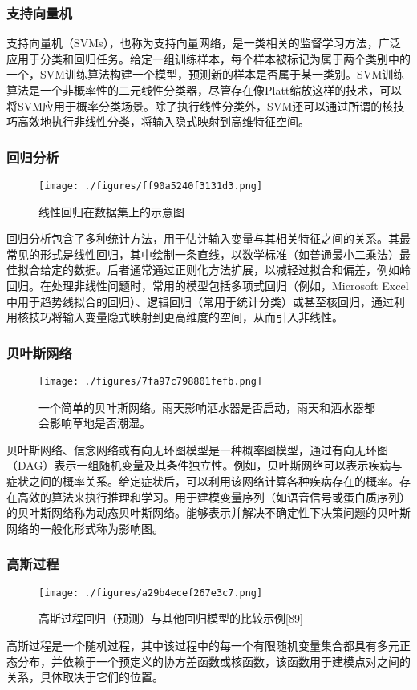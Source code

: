 \subsubsection{支持向量机}   
支持向量机（SVMs），也称为支持向量网络，是一类相关的监督学习方法，广泛应用于分类和回归任务。给定一组训练样本，每个样本被标记为属于两个类别中的一个，SVM训练算法构建一个模型，预测新的样本是否属于某一类别。SVM训练算法是一个非概率性的二元线性分类器，尽管存在像Platt缩放这样的技术，可以将SVM应用于概率分类场景。除了执行线性分类外，SVM还可以通过所谓的核技巧高效地执行非线性分类，将输入隐式映射到高维特征空间。
\subsubsection{回归分析}
\begin{figure}[ht]
\centering
\texttt{[image: ./figures/ff90a5240f3131d3.png]}
\caption{线性回归在数据集上的示意图} \label{fig_JQXX_7}
\end{figure}
回归分析包含了多种统计方法，用于估计输入变量与其相关特征之间的关系。其最常见的形式是线性回归，其中绘制一条直线，以数学标准（如普通最小二乘法）最佳拟合给定的数据。后者通常通过正则化方法扩展，以减轻过拟合和偏差，例如岭回归。在处理非线性问题时，常用的模型包括多项式回归（例如，Microsoft Excel中用于趋势线拟合的回归）、逻辑回归（常用于统计分类）或甚至核回归，通过利用核技巧将输入变量隐式映射到更高维度的空间，从而引入非线性。
\subsubsection{贝叶斯网络}
\begin{figure}[ht]
\centering
\texttt{[image: ./figures/7fa97c798801fefb.png]}
\caption{一个简单的贝叶斯网络。雨天影响洒水器是否启动，雨天和洒水器都会影响草地是否潮湿。} \label{fig_JQXX_8}
\end{figure}
贝叶斯网络、信念网络或有向无环图模型是一种概率图模型，通过有向无环图（DAG）表示一组随机变量及其条件独立性。例如，贝叶斯网络可以表示疾病与症状之间的概率关系。给定症状后，可以利用该网络计算各种疾病存在的概率。存在高效的算法来执行推理和学习。用于建模变量序列（如语音信号或蛋白质序列）的贝叶斯网络称为动态贝叶斯网络。能够表示并解决不确定性下决策问题的贝叶斯网络的一般化形式称为影响图。
\subsubsection{高斯过程}
\begin{figure}[ht]
\centering
\texttt{[image: ./figures/a29b4ecef267e3c7.png]}
\caption{高斯过程回归（预测）与其他回归模型的比较示例[89]} \label{fig_JQXX_9}
\end{figure}
高斯过程是一个随机过程，其中该过程中的每一个有限随机变量集合都具有多元正态分布，并依赖于一个预定义的协方差函数或核函数，该函数用于建模点对之间的关系，具体取决于它们的位置。

